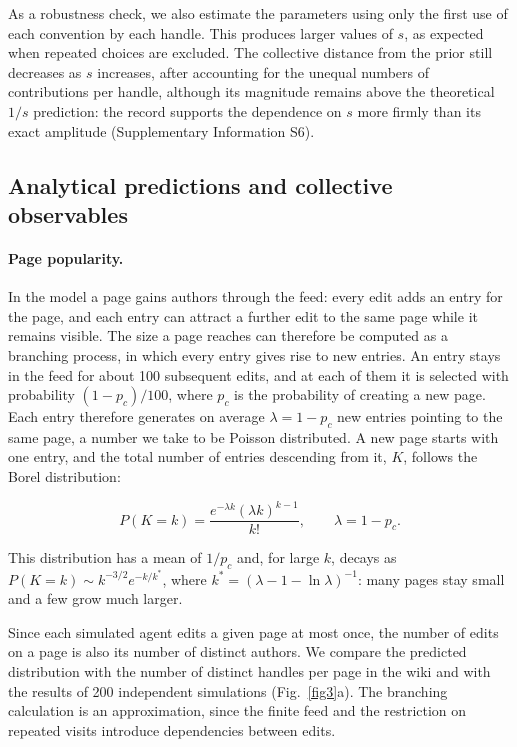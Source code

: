 \documentclass[11pt]{article}
\begin{document}
As a robustness check, we also estimate the parameters using only the first use of each convention by each handle. This produces larger values of $s$, as expected when repeated choices are excluded. The collective distance from the prior still decreases as $s$ increases, after accounting for the unequal numbers of contributions per handle, although its magnitude remains above the theoretical $1/s$ prediction: the record supports the dependence on $s$ more firmly than its exact amplitude (Supplementary Information S6).


\subsection*{Analytical predictions and collective observables}

\paragraph{Page popularity.}

In the model a page gains authors through the feed: every edit adds an entry for the page, and each entry can attract a further edit to the same page while it remains visible. The size a page reaches can therefore be computed as a branching process, in which every entry gives rise to new entries. An entry stays in the feed for about 100 subsequent edits, and at each of them it is selected with probability $(1-p_c)/100$, where $p_c$ is the probability of creating a new page. Each entry therefore generates on average $\lambda=1-p_c$ new entries pointing to the same page, a number we take to be Poisson distributed. A new page starts with one entry, and the total number of entries descending from it, $K$, follows the Borel distribution:

\begin{equation}
P(K=k)=\frac{e^{-\lambda k}(\lambda k)^{k-1}}{k!},
\qquad \lambda=1-p_c.
\label{eq:borel}
\end{equation}

This distribution has a mean of $1/p_c$ and, for large $k$, decays as $P(K=k)\sim k^{-3/2}e^{-k/k^*}$, where $k^*=(\lambda-1-\ln\lambda)^{-1}$: many pages stay small and a few grow much larger.

Since each simulated agent edits a given page at most once, the number of edits on a page is also its number of distinct authors. We compare the predicted distribution with the number of distinct handles per page in the wiki and with the results of 200 independent simulations (Fig.~\ref{fig3}a). The branching calculation is an approximation, since the finite feed and the restriction on repeated visits introduce dependencies between edits.
\end{document}

